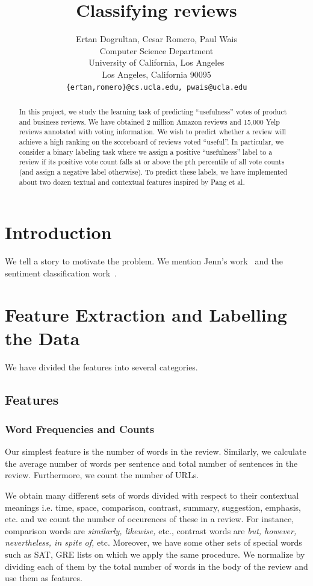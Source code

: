 \documentclass[letterpaper]{article}
\title{Classifying reviews}
\author{Ertan Dogrultan, Cesar Romero, Paul Wais\\
Computer Science Department \\
University of California, Los Angeles\\
Los Angeles, California 90095\\
\texttt{\{ertan,romero\}@cs.ucla.edu, pwais@ucla.edu}}
\begin{document}
\maketitle
\begin{abstract}
In this project, we study the learning task of predicting ``usefulness''
votes of product and business reviews.  We have obtained 2 million
Amazon reviews and 15,000 Yelp reviews annotated with voting
information.  We wish to predict whether a review will achieve a high
ranking on the scoreboard of reviews voted ``useful''.  In particular,
we consider a binary labeling task where we assign a positive
``usefulness'' label to a review if its positive vote count falls at or
above the pth percentile of all vote counts (and assign a negative
label otherwise).  To predict these labels, we have implemented about
two dozen textual and contextual features inspired by Pang et al. \cite{PangSentimentClassification}
\end{abstract}

\section{Introduction}
\label{sec:introduction}

We tell a story to motivate the problem. We mention Jenn's
work~\cite{JennLearnDiffDomains} and the sentiment classification
work~\cite{PangSentimentClassification}.

\section{Feature Extraction and Labelling the Data}
We have divided the features into several categories.
\subsection{Features}
\label{sec:features}
\subsubsection{Word Frequencies and Counts}
Our simplest feature is the number of words in the review. Similarly,
we calculate the average number of words per sentence and
total number of sentences in the review. Furthermore, we count the
number of URLs.

We obtain many different sets of words divided with respect to their
contextual meanings i.e. time, space, comparison, contrast, summary,
suggestion, emphasis, etc. and we count the number of occurences of
these in a review. For instance, comparison words are
\emph{similarly, likewise,} etc., contrast words are \emph{but,
  however, nevertheless, in spite of,} etc. Moreover, we have some
other sets of special words such as SAT, GRE lists on which we apply the same procedure.  We normalize by dividing each of them by the total
number of words in the body of the review and use them as features.   
\end{document}
